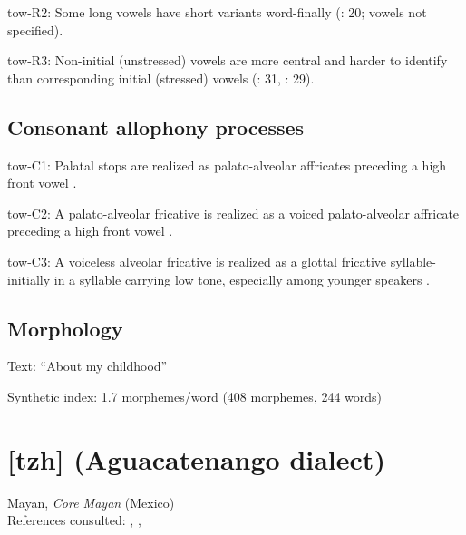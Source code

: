 {\begin{appendixdesc}
\item[tow-R2:] Some long vowels have short variants word-finally (\citealt{Yumitani1998}: 20; vowels not specified).

\item[tow-R3:] Non-initial (unstressed) vowels are more central and harder to identify than corresponding initial (stressed) vowels (\citealt{Yumitani1998}: 31, \citealt{Bell1993}: 29).
\end{appendixdesc}
\subsection*{Consonant allophony processes}
\begin{appendixdesc}

\item[tow-C1:] Palatal stops are realized as palato-alveolar affricates preceding a high front vowel \citep[13]{Yumitani1998}.

\item[tow-C2:] A palato-alveolar fricative is realized as a voiced palato-alveolar affricate preceding a high front vowel \citep[13]{Yumitani1998}.

\item[tow-C3:] A voiceless alveolar fricative is realized as a glottal fricative syllable-initially in a syllable carrying low tone, especially among younger speakers \citep[13]{Yumitani1998}.
\end{appendixdesc}
\subsection*{Morphology}

\begin{appendixdesc}

\item[Text:] “About my childhood” \citep[248--250]{Yumitani1998}

\item[Synthetic index:] 1.7 morphemes/word (408 morphemes, 244 words)
\end{appendixdesc}

\section*{[tzh]  (Aguacatenango dialect)}  %
Mayan, \textit{Core Mayan} (Mexico)\medskip\\
References consulted: \citet{Kaufman1971}, \citet{Polian2006}, \citet{Smith2007}

}
